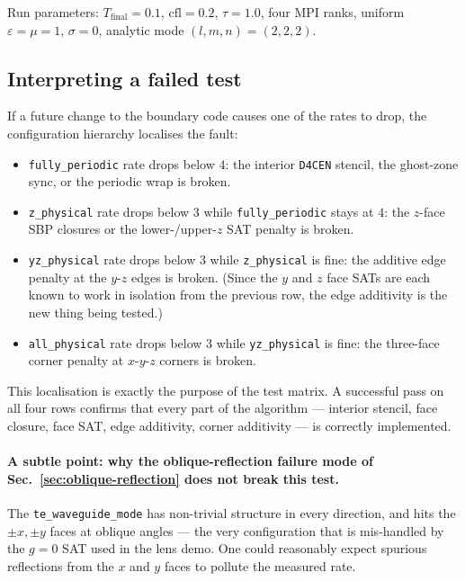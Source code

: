 \documentclass[11pt]{article}
\begin{document}
Run parameters: $T_\text{final} = 0.1$, $\mathrm{cfl} = 0.2$,
$\tau = 1.0$, four MPI ranks, uniform $\varepsilon = \mu = 1$,
$\sigma = 0$, analytic mode $(l, m, n) = (2, 2, 2)$.

\subsection{Interpreting a failed test}

If a future change to the boundary code causes one of the rates to
drop, the configuration hierarchy localises the fault:

\begin{itemize}
  \item \texttt{fully\_periodic} rate drops below $4$: the interior
    \texttt{D4CEN} stencil, the ghost-zone sync, or the periodic
    wrap is broken.
  \item \texttt{z\_physical} rate drops below $3$ while
    \texttt{fully\_periodic} stays at $4$: the $z$-face SBP
    closures or the lower-/upper-$z$ SAT penalty is broken.
  \item \texttt{yz\_physical} rate drops below $3$ while
    \texttt{z\_physical} is fine: the additive edge penalty at the
    $y$-$z$ edges is broken. (Since the $y$ and $z$ face SATs are
    each known to work in isolation from the previous row, the edge
    additivity is the new thing being tested.)
  \item \texttt{all\_physical} rate drops below $3$ while
    \texttt{yz\_physical} is fine: the three-face corner penalty at
    $x$-$y$-$z$ corners is broken.
\end{itemize}

This localisation is exactly the purpose of the test matrix. A
successful pass on all four rows confirms that every part of the
algorithm — interior stencil, face closure, face SAT, edge additivity,
corner additivity — is correctly implemented.

\paragraph{A subtle point: why the oblique-reflection failure mode
of Sec.~\ref{sec:oblique-reflection} does not break this test.}
The \texttt{te\_waveguide\_mode} has non-trivial structure in every
direction, and hits the $\pm x, \pm y$ faces at oblique angles — the
very configuration that is mis-handled by the $g = 0$ SAT used in the
lens demo. One could reasonably expect spurious reflections from the
$x$ and $y$ faces to pollute the measured rate.
\end{document}
